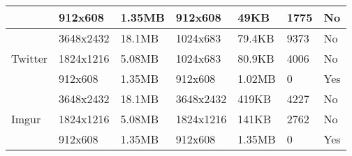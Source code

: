 \begin{table}[]
\begin{tabular}{@{}lllllll@{}}
																& 912x608                                                    & 1.35MB                                               & 912x608                                                    & 49KB                                                 & 1775                                                         & No                                                         \\ \midrule
		\multirow{3}{*}{Twitter}                                & 3648x2432                                                  & 18.1MB                                               & 1024x683                                                   & 79.4KB                                               & 9373\textsuperscript{\textdagger} 		                   & No                                                         \\
																& 1824x1216                                                  & 5.08MB                                               & 1024x683                                                   & 80.9KB                                               & 4006\textsuperscript{\textdagger}         		           & No                                                         \\
																& 912x608                                                    & 1.35MB                                               & 912x608                                                    & 1.02MB                                               & 0                                                            & Yes                                                        \\ \midrule
		\multirow{3}{*}{Imgur}                                  & 3648x2432                                                  & 18.1MB                                               & 3648x2432                                                  & 419KB                                                & 4227                                                         & No                                                         \\
																& 1824x1216                                                  & 5.08MB                                               & 1824x1216                                                  & 141KB                                                & 2762                                                         & No                                                         \\
																& 912x608                                                    & 1.35MB                                               & 912x608                                                    & 1.35MB                                               & 0                                                            & Yes                                                        \\ \bottomrule

\end{tabular}
\end{table}
